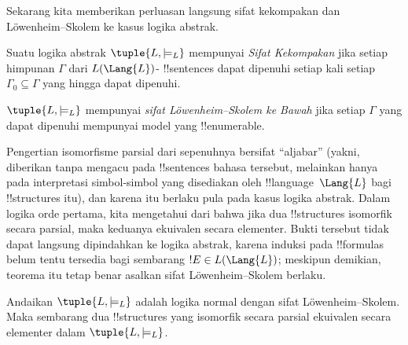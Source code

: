 \documentclass[../../../include/open-logic-section]{subfiles}
\begin{document}


Sekarang kita memberikan perluasan langsung sifat kekompakan dan
L\"owenheim--Skolem ke kasus logika abstrak.

\begin{defn}
Suatu logika abstrak $\tuple{L, \models_L}$ mempunyai \emph{Sifat
  Kekompakan} jika setiap himpunan $\Gamma$ dari $L(\Lang{L})$-
!!{sentence}s dapat dipenuhi setiap kali setiap $\Gamma_0 \subseteq \Gamma$
yang hingga dapat dipenuhi.
\end{defn}

\begin{defn}
$\tuple{L, \models_L}$ mempunyai \emph{sifat L\"owenheim--Skolem ke
  Bawah} jika setiap $\Gamma$ yang dapat dipenuhi mempunyai model yang
!!{enumerable}.
\end{defn}


Pengertian isomorfisme parsial dari 
sepenuhnya bersifat ``aljabar'' (yakni, diberikan tanpa mengacu pada
!!{sentence}s bahasa tersebut, melainkan hanya pada interpretasi simbol-simbol
yang disediakan oleh !!{language}~$\Lang{L}$ bagi !!{structure}s itu), dan
karena itu berlaku pula pada kasus logika abstrak. Dalam logika orde pertama,
kita mengetahui dari  bahwa jika dua
!!{structure}s isomorfik secara parsial, maka keduanya ekuivalen secara
elementer. Bukti tersebut tidak dapat langsung dipindahkan ke logika abstrak,
karena induksi pada !!{formula}s belum tentu tersedia bagi sembarang $!E \in
L(\Lang{L})$; meskipun demikian, teorema itu tetap benar asalkan sifat
L\"owenheim--Skolem berlaku.

\begin{thm}
Andaikan $\tuple{L, \models_L}$ adalah logika normal dengan sifat
L\"owenheim--Skolem. Maka sembarang dua !!{structure}s yang isomorfik secara
parsial ekuivalen secara elementer dalam $\tuple{L, \models_L}$.
\end{thm}
\end{document}
